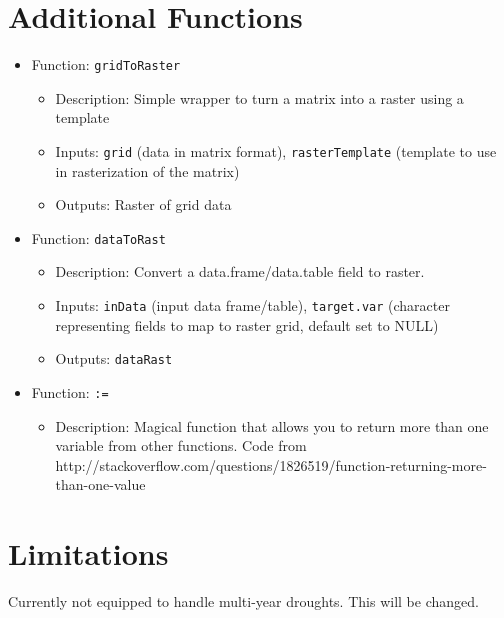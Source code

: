 \documentclass[11pt]{article}
\begin{document}
\section{Additional Functions}
\begin{itemize}
\item Function: \verb!gridToRaster!
	\begin{itemize}
	\item Description: Simple wrapper to turn a matrix into a raster using a template
    \item Inputs: \verb!grid! (data in matrix format), \verb!rasterTemplate! (template to use in rasterization of the matrix)
    \item Outputs: Raster of grid data
	\end{itemize}
\item Function: \verb!dataToRast!
	\begin{itemize}
	\item Description: Convert a data.frame/data.table field to raster.
	\item Inputs: \verb!inData! (input data frame/table), \verb!target.var! (character representing fields to map to raster grid, default set to NULL)
	\item Outputs: \verb!dataRast!
	\end{itemize}
\item Function: \verb!:=!
	\begin{itemize}
	\item Description: Magical function that allows you to return more than one variable from other functions. Code from http://stackoverflow.com/questions/1826519/function-returning-more-than-one-value
	\end{itemize}
\end{itemize}




\section{Limitations}
Currently not equipped to handle multi-year droughts. This will be changed. 
\end{document}
